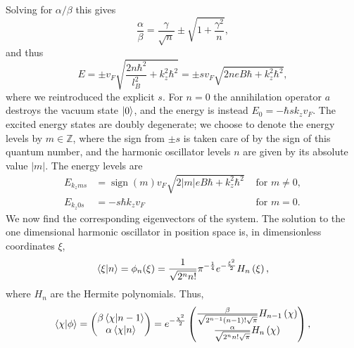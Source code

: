 Solving for $\alpha /\beta $ this gives
\begin{equation}
  \frac{\alpha}{\beta } = \frac{\gamma}{\sqrt{n}} \pm \sqrt{1 + \frac{\gamma^2}{n}},
\end{equation}
and thus
\begin{equation}
  E = \pm v_F \sqrt{
    \frac{2n \hbar ^2}{l_B^2} + k_z^2\hbar ^2
  }
  = \pm s v_F \sqrt{
    2n e B \hbar + k_z^2\hbar ^2
  },
\end{equation}
where we reintroduced the explicit $s$.
For $n = 0$ the annihilation operator $a$ destroys the vacuum state $\ket{0}$, and the energy is instead $E_0 = -\hbar s k_z v_F$.
The excited energy states are doubly degenerate;
we choose to denote the energy levels by $m \in \mathbb{Z}$, where the sign from $\pm s$ is taken care of by the sign of this quantum number, and the harmonic oscillator levels $n$ are given by its absolute value $|m|$.
The energy levels are
\begin{subequations}
  \label{eq:106}
  \begin{align}
    \label{eq:104}
    E_{k_z m s} &= \operatorname{sign}(m) v_F \sqrt{2 |m| e B \hbar  + k_z^2 \hbar ^2} & \text{ for } m \neq 0,\\
    \label{eq:105}
    E_{k_z 0 s} &= -s \hbar k_z v_F & \text{ for } m = 0.
  \end{align}
\end{subequations}
We now find the corresponding eigenvectors of the system.
The solution to the one dimensional harmonic oscillator in position space is, in dimensionless coordinates $\xi$,~\cite[Eq.~18.39.5]{NIST:DLMF}
\begin{equation}
  \braket{\xi | n} = \phi _n (\xi)
  = \frac{1}{\sqrt{2^nn!}} \pi^{-\frac{1}{4}}
  e^{- \frac{\xi^2}{2}} H_n \left( \xi \right),
\end{equation}
where $H_n$ are the Hermite polynomials.
Thus,
\begin{equation}
  \braket{\chi | \phi } =
  \begin{pmatrix}
    \beta \braket{\chi | n-1}\\
    \alpha \braket{\chi | n}
  \end{pmatrix}
  =
  e^{- \frac{\chi^2}{2}}
  \begin{pmatrix}
    \frac{\beta }{\sqrt{2^{n-1}(n-1)!\sqrt{\pi }}} H_{n-1} \left( \chi \right)\\
    \frac{\alpha }{\sqrt{2^{n}n!\sqrt{\pi }}} H_n \left(\chi \right)\\
  \end{pmatrix},
\end{equation}
